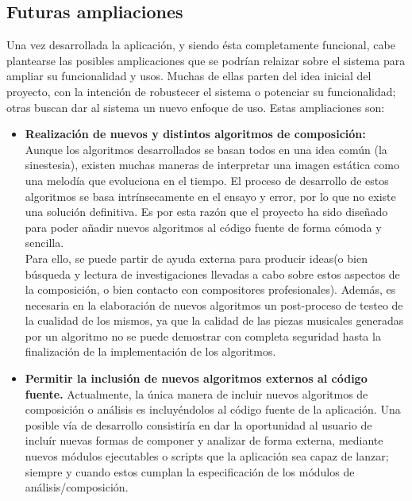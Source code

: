 \subsection{Futuras ampliaciones}

Una vez desarrollada la aplicación, y siendo ésta completamente funcional, cabe plantearse las posibles amplicaciones que se podrían relaizar sobre el sistema para ampliar su funcionalidad y usos. Muchas de ellas parten del idea inicial del proyecto, con la intención de robustecer el sistema o potenciar su funcionalidad; otras buscan dar al sistema un nuevo enfoque de uso. Estas ampliaciones son:

\begin{itemize}

\item\textbf{Realización de nuevos y distintos algoritmos de composición:} Aunque los algoritmos desarrollados se basan todos en una idea común (la sinestesia), existen muchas maneras de interpretar una imagen estática como una melodía que evoluciona en el tiempo. El proceso de desarrollo de estos algoritmos se basa intrínsecamente en el ensayo y error, por lo que no existe una solución definitiva. Es por esta razón que el proyecto ha sido diseñado para poder añadir nuevos algoritmos al código fuente de forma cómoda y sencilla.\\

Para ello, se puede partir de ayuda externa para producir ideas(o bien búsqueda y lectura de investigaciones llevadas a cabo sobre estos aspectos de la composición, o bien contacto con compositores profesionales). Además, es necesaria en la elaboración de nuevos algoritmos un post-proceso de testeo de la cualidad de los mismos, ya que la calidad de las piezas musicales generadas por un algoritmo no se puede demostrar con completa seguridad hasta la finalización de la implementación de los algoritmos.

\item\textbf{Permitir la inclusión de nuevos algoritmos externos al código fuente.} Actualmente, la única manera de incluir nuevos algoritmos de composición o análisis es incluyéndolos al código fuente de la aplicación. Una posible vía de desarrollo consistiría en dar la oportunidad al usuario de incluír nuevas formas de componer y analizar de forma externa, mediante nuevos módulos ejecutables o scripts que la aplicación sea capaz de lanzar; siempre y cuando estos cumplan la especificación de los módulos de análisis/composición.\\


\end{itemize}
